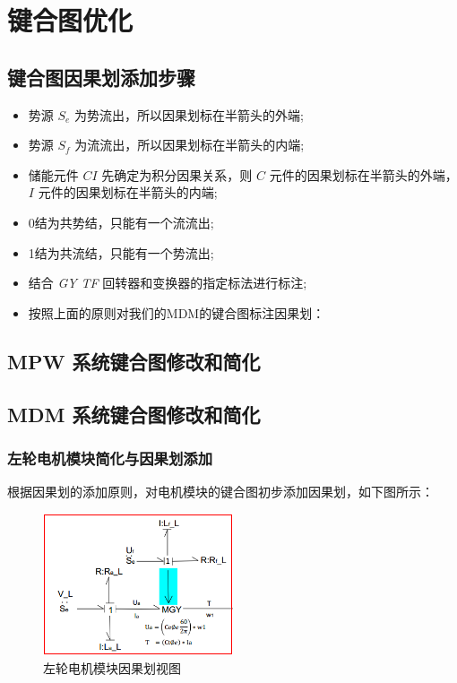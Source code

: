 \clearpage
\section{键合图优化}

\subsection{键合图因果划添加步骤}

\begin{itemize}
	\item 势源 $S_e$ 为势流出，所以因果划标在半箭头的外端;
	\item 势源 $S_f$ 为流流出，所以因果划标在半箭头的内端;
	\item 储能元件 $C I$ 先确定为积分因果关系，则 $C$ 元件的因果划标在半箭头的外端， $I$ 元件的因果划标在半箭头的内端;
	\item 0结为共势结，只能有一个流流出;
	\item 1结为共流结，只能有一个势流出;
	\item 结合 \textit{GY} \textit{TF} 回转器和变换器的指定标法进行标注;
	\item 按照上面的原则对我们的MDM的键合图标注因果划：
\end{itemize}

\subsection{MPW 系统键合图修改和简化}



\subsection{MDM 系统键合图修改和简化}

\subsubsection{左轮电机模块简化与因果划添加}

根据因果划的添加原则，对电机模块的键合图初步添加因果划，如下图所示：
\begin{figure}[H]
	\centering
	\includegraphics[width=0.5\textwidth]{fig/bond/MDM1.png}
	\caption{左轮电机模块因果划视图}\label{fig:bond_MDM1}
\end{figure}

